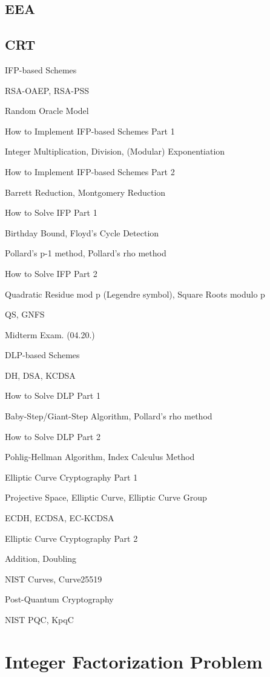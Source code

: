 \documentclass[12pt,openany]{book}
\theoremstyle{definition}
\begin{document}
	\section{EEA}
	\section{CRT}
	
	\newpage
	IFP-based Schemes
	
	RSA-OAEP, RSA-PSS
	
	Random Oracle Model
	
	
	How to Implement IFP-based Schemes Part 1
	
	Integer Multiplication, Division, (Modular) Exponentiation
	
	
	How to Implement IFP-based Schemes Part 2
	
	Barrett Reduction, Montgomery Reduction
	
	
	How to Solve IFP Part 1
	
	Birthday Bound, Floyd's Cycle Detection
	
	Pollard’s p-1 method, Pollard’s rho method
	
	
	How to Solve IFP Part 2
	
	Quadratic Residue mod p (Legendre symbol), Square Roots modulo p
	
	QS, GNFS
	
	
	Midterm Exam. (04.20.)
	
	
	DLP-based Schemes
	
	DH, DSA, KCDSA
	
	
	How to Solve DLP Part 1
	
	Baby-Step/Giant-Step Algorithm, Pollard’s rho method
	
	
	How to Solve DLP Part 2
	
	Pohlig-Hellman Algorithm, Index Calculus Method
	
	
	Elliptic Curve Cryptography Part 1
	
	Projective Space, Elliptic Curve, Elliptic Curve Group
	
	ECDH, ECDSA, EC-KCDSA
	
	
	Elliptic Curve Cryptography Part 2
	
	Addition, Doubling
	
	NIST Curves, Curve25519
	
	
	Post-Quantum Cryptography
	
	NIST PQC, KpqC
	
	
	\newpage
	\chapter{Integer Factorization Problem}
	
\end{document}
